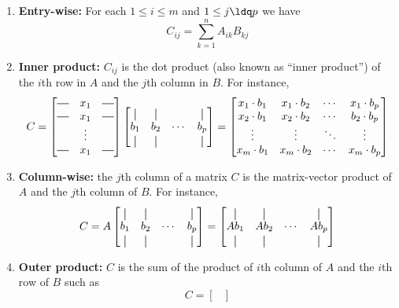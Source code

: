 \documentclass[11pt]{article}
\newcommand*{\vertbar}{\rule[-1ex]{0.5pt}{2.5ex}}
\newcommand*{\horzbar}{\rule[.5ex]{2.5ex}{0.5pt}}
\begin{document}
\begin{itemize}
	\begin{enumerate}
		\item \textbf{Entry-wise:} For each $1 \leq i \leq m$ and $1 \leq j \ldq p$ we have
			$$C_{ij}= \sum_{k=1}^{n} A_{ik}B_{kj}$$
		\item \textbf{Inner product:} $C_{ij}$ is the dot product (also known as ``inner product'') of the $i$th row in $A$ and the $j$th column in $B$. For instance,
			$$C = \begin{bmatrix}
			  \horzbar & x_{1} & \horzbar\\
			  \horzbar & x_{1} & \horzbar\\
					   & \vdots & \\
			  \horzbar & x_{1} & \horzbar
			\end{bmatrix} \begin{bmatrix}
			  \vertbar & \vertbar & &\vertbar \\
			  b_{1} & b_{2} & \cdots & b_{p} \\
			  \vertbar & \vertbar & &\vertbar 
			\end{bmatrix} = \begin{bmatrix}
			  x_{1} \cdot b_{1} & x_{1} \cdot b_{2} & \cdots  & x_{1} \cdot b_{p}\\
			x_{2} \cdot b_{1} & x_{2}\cdot b_{2} & \cdots & b_{2} \cdot b_{p}\\
			\vdots & \vdots & \ddots & \vdots\\
			x_{m}\cdot b_{1} & x_{m} \cdot b_{2} & \cdots & x_{m} \cdot b_{p}
			\end{bmatrix}$$
		\item \textbf{Column-wise: }the $j$th column of a matrix $C$ is the matrix-vector product of $A$ and the $j$th column of $B$. For instance,
			$$C = A \begin{bmatrix}
			  \vertbar & \vertbar &  & \vertbar\\
			b_{1} & b_{2} & \cdots & b_{p}\\
			  \vertbar & \vertbar &  & \vertbar
			\end{bmatrix} = \begin{bmatrix}   
			  \vertbar & \vertbar &  & \vertbar\\
			Ab_{1} & Ab_{2} & \cdots & Ab_{p}\\
			  \vertbar & \vertbar &  & \vertbar
			\end{bmatrix}$$
		\item \textbf{Outer product:} $C$ is the sum of the product of $i$th column of $A$ and the $i$th row of $B$ such as
			$$C=\begin{bmatrix}

\end{bmatrix}$$
\end{enumerate}
\end{itemize}
\end{document}
